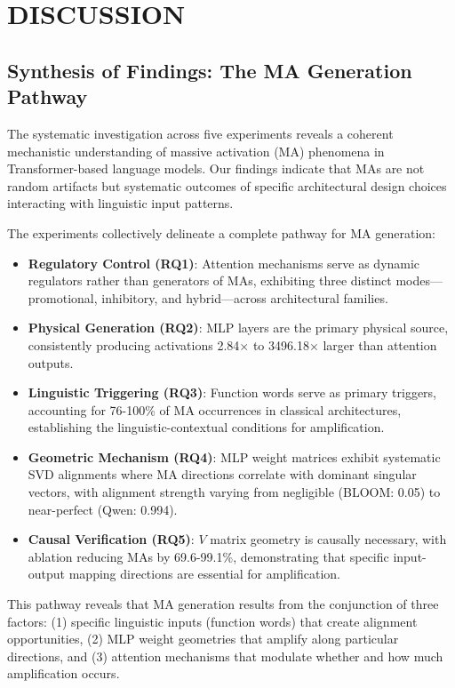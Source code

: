 \documentclass[conference]{IEEEtran}
\begin{document}
\section{DISCUSSION}

\subsection{Synthesis of Findings: The MA Generation Pathway}

The systematic investigation across five experiments reveals a coherent mechanistic understanding of massive activation (MA) phenomena in Transformer-based language models. Our findings indicate that MAs are not random artifacts but systematic outcomes of specific architectural design choices interacting with linguistic input patterns.

The experiments collectively delineate a complete pathway for MA generation:
\begin{itemize}
    \item \textbf{Regulatory Control (RQ1)}: Attention mechanisms serve as dynamic regulators rather than generators of MAs, exhibiting three distinct modes—promotional, inhibitory, and hybrid—across architectural families.
    
    \item \textbf{Physical Generation (RQ2)}: MLP layers are the primary physical source, consistently producing activations 2.84$\times$ to 3496.18$\times$ larger than attention outputs.
    
    \item \textbf{Linguistic Triggering (RQ3)}: Function words serve as primary triggers, accounting for 76-100\% of MA occurrences in classical architectures, establishing the linguistic-contextual conditions for amplification.
    
    \item \textbf{Geometric Mechanism (RQ4)}: MLP weight matrices exhibit systematic SVD alignments where MA directions correlate with dominant singular vectors, with alignment strength varying from negligible (BLOOM: 0.05) to near-perfect (Qwen: 0.994).
    
    \item \textbf{Causal Verification (RQ5)}: $V$ matrix geometry is causally necessary, with ablation reducing MAs by 69.6-99.1\%, demonstrating that specific input-output mapping directions are essential for amplification.
\end{itemize}

This pathway reveals that MA generation results from the conjunction of three factors: (1) specific linguistic inputs (function words) that create alignment opportunities, (2) MLP weight geometries that amplify along particular directions, and (3) attention mechanisms that modulate whether and how much amplification occurs.
\end{document}
